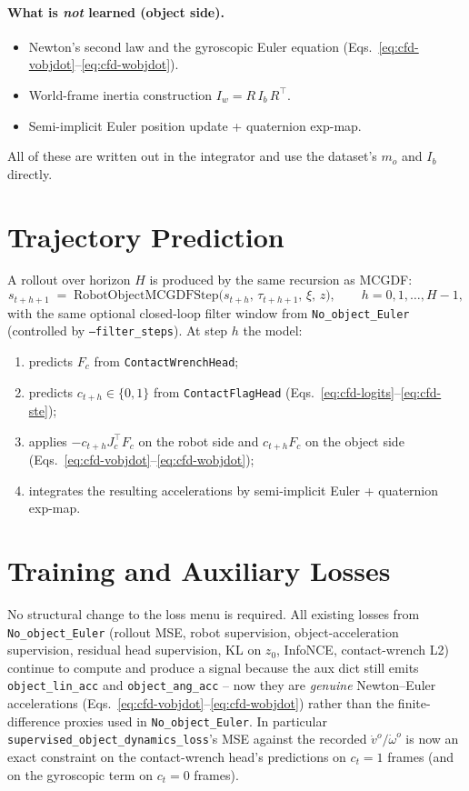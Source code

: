 \documentclass[11pt]{article}
\begin{document}
\paragraph{What is \emph{not} learned (object side).}
\begin{itemize}
  \item Newton's second law and the gyroscopic Euler equation
    (Eqs.~\eqref{eq:cfd-vobjdot}--\eqref{eq:cfd-wobjdot}).
  \item World-frame inertia construction
    $I_w = R\,I_b\,R^\top$.
  \item Semi-implicit Euler position update + quaternion exp-map.
\end{itemize}
All of these are written out in the integrator and use the dataset's
$m_o$ and $I_b$ directly.

\section{Trajectory Prediction}

A rollout over horizon $H$ is produced by the same recursion as
MCGDF:
\begin{equation}
  s_{t+h+1} \;=\; \mathrm{RobotObjectMCGDFStep}\bigl(s_{t+h},\,\tau_{t+h+1},\,\xi,\,z\bigr),
  \qquad h = 0, 1, \dots, H-1,
\end{equation}
with the same optional closed-loop filter window from
\texttt{No\_object\_Euler} (controlled by \texttt{--filter\_steps}).
At step $h$ the model:
\begin{enumerate}
  \item predicts $F_c$ from \texttt{ContactWrenchHead};
  \item predicts $c_{t+h} \in \{0, 1\}$ from \texttt{ContactFlagHead}
    (Eqs.~\eqref{eq:cfd-logits}--\eqref{eq:cfd-ste});
  \item applies $-c_{t+h} J_c^\top F_c$ on the robot side and
    $c_{t+h} F_c$ on the object side
    (Eqs.~\eqref{eq:cfd-vobjdot}--\eqref{eq:cfd-wobjdot});
  \item integrates the resulting accelerations by semi-implicit
    Euler + quaternion exp-map.
\end{enumerate}

\section{Training and Auxiliary Losses}

No structural change to the loss menu is required.  All existing
losses from \texttt{No\_object\_Euler} (rollout MSE, robot supervision,
object-acceleration supervision, residual head supervision, KL on
$z_0$, InfoNCE, contact-wrench L2) continue to compute and produce a
signal because the aux dict still emits \texttt{object\_lin\_acc} and
\texttt{object\_ang\_acc} -- now they are \emph{genuine}
Newton--Euler accelerations
(Eqs.~\eqref{eq:cfd-vobjdot}--\eqref{eq:cfd-wobjdot}) rather than the
finite-difference proxies used in
\texttt{No\_object\_Euler}.  In particular
\texttt{supervised\_object\_dynamics\_loss}'s MSE against the recorded
$\dot v^o / \dot \omega^o$ is now an exact constraint on the
contact-wrench head's predictions on $c_t = 1$ frames (and on the
gyroscopic term on $c_t = 0$ frames).
\end{document}
